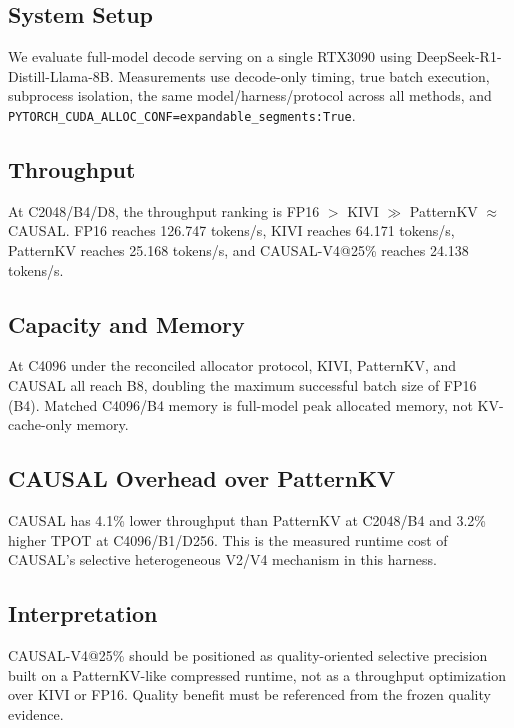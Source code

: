 \subsection{System Setup}
We evaluate full-model decode serving on a single RTX3090 using DeepSeek-R1-Distill-Llama-8B. Measurements use decode-only timing, true batch execution, subprocess isolation, the same model/harness/protocol across all methods, and \texttt{PYTORCH\_CUDA\_ALLOC\_CONF=expandable\_segments:True}.

\subsection{Throughput}
At C2048/B4/D8, the throughput ranking is FP16 $>$ KIVI $\gg$ PatternKV $\approx$ CAUSAL. FP16 reaches 126.747 tokens/s, KIVI reaches 64.171 tokens/s, PatternKV reaches 25.168 tokens/s, and CAUSAL-V4@25\% reaches 24.138 tokens/s.

\subsection{Capacity and Memory}
At C4096 under the reconciled allocator protocol, KIVI, PatternKV, and CAUSAL all reach B8, doubling the maximum successful batch size of FP16 (B4). Matched C4096/B4 memory is full-model peak allocated memory, not KV-cache-only memory.

\subsection{CAUSAL Overhead over PatternKV}
CAUSAL has 4.1\% lower throughput than PatternKV at C2048/B4 and 3.2\% higher TPOT at C4096/B1/D256. This is the measured runtime cost of CAUSAL's selective heterogeneous V2/V4 mechanism in this harness.

\subsection{Interpretation}
CAUSAL-V4@25\% should be positioned as quality-oriented selective precision built on a PatternKV-like compressed runtime, not as a throughput optimization over KIVI or FP16. Quality benefit must be referenced from the frozen quality evidence.
